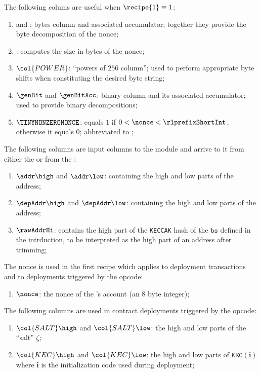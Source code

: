 The following colums are useful when $\recipe{1} \equiv 1$:
\begin{enumerate}[resume]
	\item \genByte{} and \genByteAcc:
		bytes column and associated accumulator; together they provide the byte decomposition of the nonce;
	\item \accsize:
		computes the size in bytes of the nonce;
	\item $\col{POWER}$:
		``powers of $256$ column'';
		used to perform appropriate byte shifts when constituting the desired byte string;
	\item $\genBit$ and $\genBitAcc$:
		binary column and its associated accumulator; used to provide binary decompositions; 
	\item $\TINYNONZERONONCE$:
		\ccbc{}
		equals $1$ if $0 < \nonce < \rlprefixShortInt$, otherwise it equals $0$; abbreviated to \tinyNonzeroNonce{};
\end{enumerate}
The following columns are input columns to the module and arrive to it from either the \userTxnDataMod{} or from the \hubMod{}:
\begin{enumerate}[resume]
	\item $\addr\high$ and $\addr\low$: 
		\godGiven{}
		\ccc{} containing the high and low parts of the \creator{} address;
	\item $\depAddr\high$ and $\depAddr\low$: 
		\godGiven{}
		\ccc{} containing the high and low parts of the \createe{} address;
	\item $\rawAddrHi$:
		\godGiven{}
		contains the high part of the \texttt{KECCAK} hash of the $\texttt{bs}$ defined in the intrduction, to be interpreted as the high part of an address after trimming;
\end{enumerate}
The nonce is used in the first recipe which applies to deployment transactions and to deployments triggered by the  opcode:
\begin{enumerate}[resume]
	\item $\nonce$:
		\godGiven{}
		the nonce of the \creator's account (an $8$ byte integer);
\end{enumerate}
The following columns are used in contract deployments triggered by the  opcode:
\begin{enumerate}[resume]
	\item $\col{SALT} \high$ and $\col{SALT} \low$:
		\godGiven{}
		the high and low parts of the ``salt'' $\zeta$;
	\item $\col{KEC} \high$ and $\col{KEC} \low$:
		\godGiven{}
		the high and low parts of $\texttt{KEC}(\textbf{i})$ where \textbf{i} is the initialization code used during deployment;
\end{enumerate}
